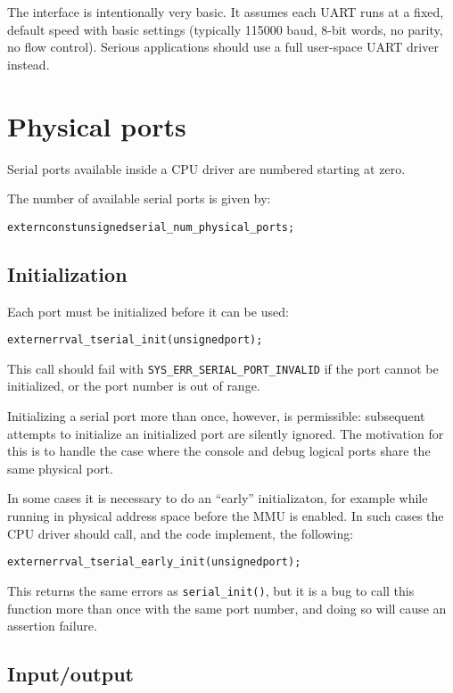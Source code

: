 \documentclass[a4paper,twoside]{report} %
\begin{document}
The interface is intentionally very basic.  It assumes each UART runs
at a fixed, default speed with basic settings (typically 115000 baud,
8-bit words, no parity, no flow control).   Serious applications
should use a full user-space UART driver instead. 

\section{Physical ports}

Serial ports available inside a CPU driver are numbered starting at
zero. 

The number of available serial ports is given by:
\begin{alltt}
  extern const unsigned serial\_num\_physical\_ports;
\end{alltt}

\subsection{Initialization}

Each port must be initialized before it can be used:
\begin{alltt}
  extern errval\_t serial\_init(unsigned port);
\end{alltt}
This call should fail with \texttt{SYS\_ERR\_SERIAL\_PORT\_INVALID} if
the port cannot be initialized, or the port number is out of range.

Initializing a serial port more than once, however, is permissible:
subsequent attempts to initialize an initialized port are silently
ignored.  The motivation for this is to handle the case where the
console and debug logical ports share the same physical port. 

In some cases it is necessary to do an ``early'' initializaton, for
example while running in physical address space before the MMU is
enabled.  In such cases the CPU driver should call, and the code
implement, the following:
\begin{alltt}
  extern errval\_t serial\_early\_init(unsigned port);
\end{alltt}

This returns the same errors as \texttt{serial\_init()}, but it is a
bug to call this function more than once with the same port number,
and doing so will cause an assertion failure. 

\subsection{Input/output}
\end{document}
